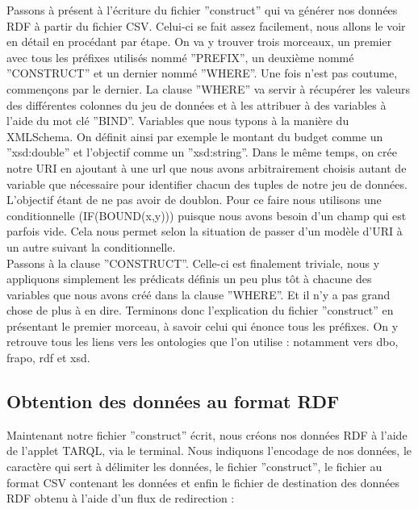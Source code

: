 \documentclass[a4paper,sffamily,12pt]{article}
\begin{document}
			Passons à présent à l'écriture du fichier ''construct'' qui va générer nos données RDF à partir du fichier CSV. Celui-ci se fait assez facilement, nous allons le voir en détail en procédant par étape. On va y trouver trois morceaux, un premier avec tous les préfixes utilisés nommé ''PREFIX'', un deuxième nommé ''CONSTRUCT'' et un dernier nommé ''WHERE''. Une fois n'est pas coutume, commençons par le dernier. La clause ''WHERE'' va servir à récupérer les valeurs des différentes colonnes du jeu de données et à les attribuer à des variables à l'aide du mot clé ''BIND''. Variables que nous typons à la manière du XMLSchema. On définit ainsi par exemple le montant du budget comme un ''xsd:double'' et l'objectif comme un ''xsd:string''. Dans le même temps, on crée notre URI en ajoutant à une url que nous avons arbitrairement choisis autant de variable que nécessaire pour identifier chacun des tuples de notre jeu de données. L'objectif étant de ne pas avoir de doublon. Pour ce faire nous utilisons une conditionnelle (IF(BOUND(x,y))) puisque nous avons besoin d'un champ qui est parfois vide. Cela nous permet selon la situation de passer d'un modèle d'URI à un autre suivant la conditionnelle. \\
			
			\indent Passons à la clause ''CONSTRUCT''. Celle-ci est finalement triviale,  nous y appliquons simplement les prédicats définis un peu plus tôt à chacune des variables que nous avons créé dans la clause ''WHERE''.  Et il n'y a pas grand chose de plus à en dire. Terminons donc l'explication du fichier ''construct'' en présentant le premier morceau, à savoir celui qui énonce tous les préfixes. On y retrouve tous les liens vers les ontologies que l'on utilise : notamment vers dbo, frapo, rdf et xsd.
			
			\newpage 
						
		\subsection{Obtention des données au format RDF}
			
			\vspace{0.5cm}
	
			Maintenant notre fichier ''construct'' écrit, nous créons nos données RDF à l'aide de l'applet TARQL, via le terminal. Nous indiquons l'encodage de nos données, le caractère qui sert à délimiter les données, le fichier ''construct'', le fichier au format CSV contenant les données et enfin le fichier de destination des données RDF obtenu à l'aide d'un flux de redirection : \\
			
\end{document}
